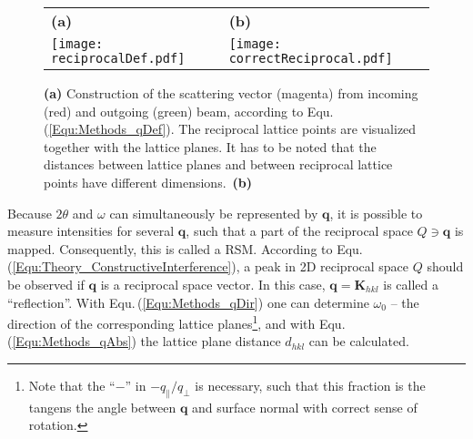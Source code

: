 \begin{figure}
    \centering
    \begin{tabular}{ll}
        \textbf{(a)}&\textbf{(b)}\\
        \texttt{[image: reciprocalDef.pdf]}
        &\texttt{[image: correctReciprocal.pdf]}
    \end{tabular}
    \caption{\textbf{(a)} Construction of the scattering vector (magenta) from incoming (red) and outgoing (green) beam, according to Equ.\,(\ref{Equ:Methods_qDef}).
    The reciprocal lattice points are visualized together with the lattice planes.
    It has to be noted that the distances between lattice planes and between reciprocal lattice points have different dimensions.\ 
    \textbf{(b)}\tbd}
    \label{Fig:Methods_qDef}
\end{figure} 
Because $2\theta$ and $\omega$ can simultaneously be represented by $\mathbf{q}$, it is possible to measure intensities for several $\mathbf{q}$, such that a part of the reciprocal space $Q\ni\mathbf{q}$ is mapped.
Consequently, this is called a \gls{RSM}.
According to Equ.\,(\ref{Equ:Theory_ConstructiveInterference}), a peak in 2D reciprocal space $Q$ should be observed if $\mathbf{q}$ is a reciprocal space vector.
In this case, $\mathbf{q}=\mathbf{K}_{hkl}$ is called a \enquote{reflection}.
With Equ.\,(\ref{Equ:Methods_qDir}) one can determine $\omega_0$ -- the direction of the corresponding lattice planes\footnote{
    Note that the \enquote{$-$} in $-q_\parallel/q_\perp$ is necessary, such that this fraction is the tangens the angle between $\mathbf{q}$ and surface normal with correct sense of rotation. 
}, and with Equ.\,(\ref{Equ:Methods_qAbs}) the lattice plane distance $d_{hkl}$ can be calculated.

